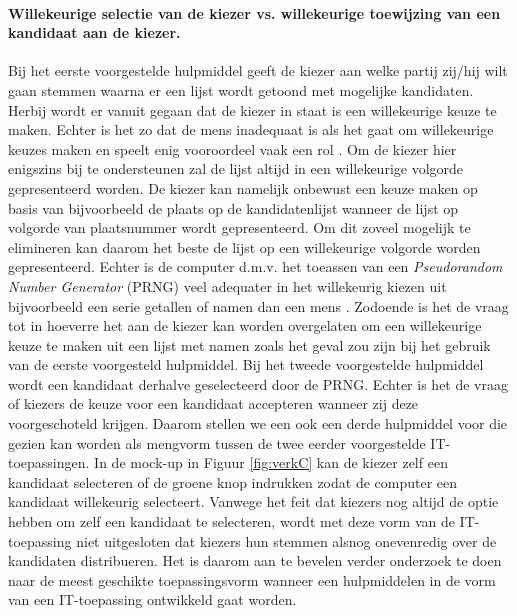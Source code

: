 \paragraph{Willekeurige selectie van de kiezer vs. willekeurige toewijzing van een kandidaat aan de kiezer.} Bij het eerste voorgestelde hulpmiddel geeft de kiezer aan welke partij zij/hij wilt gaan stemmen waarna er een lijst wordt getoond met mogelijke kandidaten. Herbij wordt er vanuit gegaan dat de kiezer in staat is een willekeurige keuze te maken. Echter is het zo dat de mens inadequaat is als het gaat om willekeurige keuzes maken en speelt enig vooroordeel vaak een rol \citep{schulz2012analysing,bar1991perception,neuringer1986can}. Om de kiezer hier enigszins bij te ondersteunen zal de lijst altijd in een willekeurige volgorde gepresenteerd worden. De kiezer kan namelijk onbewust een keuze maken op basis van bijvoorbeeld de plaats op de kandidatenlijst wanneer de lijst op volgorde van plaatsnummer wordt gepresenteerd. Om dit zoveel mogelijk te elimineren kan daarom het beste de lijst op een willekeurige volgorde worden gepresenteerd. Echter is de computer d.m.v. het toeassen van een \textit{Pseudorandom Number Generator} (PRNG) veel adequater in het willekeurig kiezen uit bijvoorbeeld een serie getallen of namen dan een mens \citep{lewis1969pseudo,RANDO99:online,matsumoto1998mersenne,rukhin2001statistical}. Zodoende is het de vraag tot in hoeverre het aan de kiezer kan worden overgelaten om een willekeurige keuze te maken uit een lijst met namen zoals het geval zou zijn bij het gebruik van de eerste voorgesteld hulpmiddel. Bij het tweede voorgestelde hulpmiddel wordt  een kandidaat derhalve geselecteerd door de PRNG. Echter is het de vraag of kiezers de keuze voor een kandidaat accepteren wanneer zij deze voorgeschoteld krijgen. Daarom stellen we een ook een derde hulpmiddel voor die gezien kan worden als mengvorm tussen de twee eerder voorgestelde IT-toepassingen. In de mock-up in Figuur \ref{fig:verkC} kan de kiezer zelf een kandidaat selecteren of de groene knop indrukken zodat de computer een kandidaat willekeurig selecteert. Vanwege het feit dat kiezers nog altijd de optie hebben om zelf een kandidaat te selecteren, wordt met deze vorm van de IT-toepassing niet uitgesloten dat kiezers hun stemmen alsnog onevenredig over de kandidaten distribueren. Het is daarom aan te bevelen verder onderzoek te doen naar de meest geschikte toepassingsvorm wanneer een hulpmiddelen in de vorm van een IT-toepassing ontwikkeld gaat worden.  

